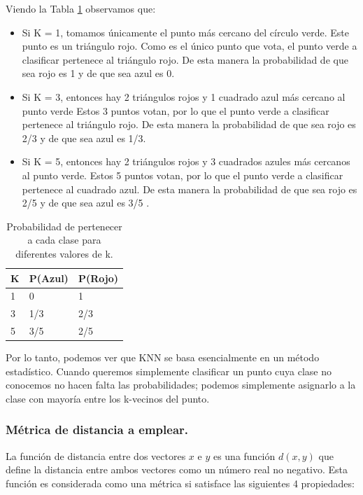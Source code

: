 \documentclass[12pt,a4paper]{article}
\begin{document}
\begin{sloppypar}
Viendo la Tabla \ref{table:2} observamos que:

\begin{itemize}
\item Si K = 1, tomamos únicamente el punto más cercano del círculo verde. Este punto es un triángulo rojo. Como es el único punto que vota, el punto verde a clasificar pertenece al triángulo rojo. De esta manera la probabilidad de que sea rojo es 1 y de que sea azul es 0.
\item Si K = 3, entonces hay 2 triángulos rojos y 1 cuadrado azul más cercano al punto verde Estos 3 puntos votan, por lo que el punto verde a clasificar pertenece al triángulo rojo. De esta manera la probabilidad de que sea rojo es 2/3  y de que sea azul es 1/3.
\item Si K = 5, entonces hay 2 triángulos rojos y 3 cuadrados azules más cercanos al punto verde. Estos 5 puntos votan, por lo que el punto verde a clasificar pertenece al cuadrado azul. De esta manera la probabilidad de que sea rojo es 2/5 y de que sea azul es 3/5 .
\end{itemize}

\begin{table}[h!]
\centering
\begin{tabular}{|p{2cm}|p{2cm}|p{2cm}|}
\hline
\textbf{K} & \textbf{P(Azul)} & \textbf{P(Rojo)} \\ [1ex] 
\hline
1 & 0 & 1 \\
\hline
3 & 1/3 & 2/3 \\
\hline
5 & 3/5 & 2/5 \\ [1ex] 
\hline
\end{tabular}
\caption{Probabilidad de pertenecer a cada clase para diferentes valores de k.}
\label{table:2}
\end{table}

Por lo tanto, podemos ver que KNN se basa esencialmente en un método estadístico. Cuando queremos simplemente clasificar un punto cuya clase no conocemos no hacen falta las probabilidades; podemos simplemente asignarlo a la clase con mayoría entre los k-vecinos del punto.\\

\subsubsection{Métrica de distancia a emplear.}\label{metrica_dist_emp}

La función de distancia entre dos vectores $x$ e $y$ es una función $d(x,y)$ que define la distancia entre ambos vectores como un número real no negativo. Esta función es considerada como una métrica si satisface las siguientes 4 propiedades\cite{KNN_Ejemplo}: 


\end{sloppypar}
\end{document}
